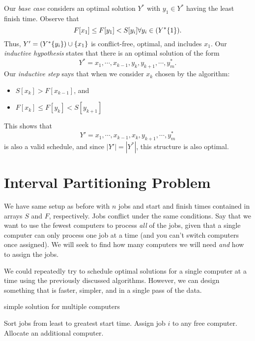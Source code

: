 \documentclass[titlepage, 12pt, leqno]{article}
\begin{document}
Our \textit{base case} considers an optimal solution $Y^{*}$ with $y_{1} \in 
Y^{*}$ having the least finish time. Observe that
\[
    F[x_{1}] \le F[y_{1}] < S[y_{i}] \forall y_{i} \in (Y^{*} \\ \{1\}).
\]
Thus, $Y' = (Y^{*} \\ \{y_{i}\}) \cup \{x_{1}\}$ is conflict-free, optimal, 
and includes $x_{1}$. Our \textit{inductive hypothesis} states that there is an
optimal solution of the form
\[
    Y^{*} = x_{1}, \cdots , x_{k-1}, y_{k}, y_{k+1}, \cdots , y_{m}^{*}.
\]
Our \textit{inductive step} says that when we consider $x_{k}$ chosen by the
algorithm:
\begin{itemize}
    \item $S[x_{k}] > F[x_{k-1}]$, and
    \item $F[x_{k}] \le F[y_{k}] < S[y_{k+1}]$
\end{itemize}
This shows that
\[
    Y' = x_{1}, \cdots , x_{k-1}, x_{k}, y_{k+1}, \cdots , y_{m}^{*}
\]
is also a valid schedule, and since $|Y'| = |Y^{*}|$, this structure is also
optimal.

\pagebreak
\section{Interval Partitioning Problem}
We have same setup as before with $n$ jobs and start and finish times contained
in arrays $S$ and $F$, respectively. Jobs conflict under the same conditions.
Say that we want to use the fewest computers to process \textit{all} of the jobs,
given that a single computer can only process one job at a time (and you can't
switch computers once assigned). We will seek to find how many computers we will
need \textit{and} how to assign the jobs.

We could repeatedly try to schedule optimal solutions for a single computer at
a time using the previously discussed algorithms. However, we can design 
something that is faster, simpler, and in a single pass of the data.

\begin{algorithm}
\caption{simple solution for multiple computers}
\begin{algorithmic}[1]
    \State Sort jobs from least to greatest start time.
            \State Assign job $i$ to any free computer.
        \Else
            \State Allocate an additional computer.        
        \EndIf
    \EndFor
\EndProcedure 
\end{algorithmic}
\end{algorithm}
\end{document}
